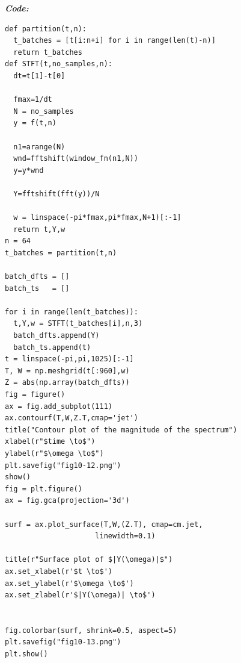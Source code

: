 \documentclass[11pt, a4paper]{article}
\begin{document}
\textit{\textbf{Code:}}
\begin{lstlisting}
def partition(t,n):
  t_batches = [t[i:n+i] for i in range(len(t)-n)]
  return t_batches
def STFT(t,no_samples,n):
  dt=t[1]-t[0]

  fmax=1/dt
  N = no_samples
  y = f(t,n)
  
  n1=arange(N)
  wnd=fftshift(window_fn(n1,N))
  y=y*wnd
      
  Y=fftshift(fft(y))/N
  
  w = linspace(-pi*fmax,pi*fmax,N+1)[:-1]        
  return t,Y,w
n = 64
t_batches = partition(t,n)

batch_dfts = []
batch_ts   = []

for i in range(len(t_batches)):
  t,Y,w = STFT(t_batches[i],n,3)
  batch_dfts.append(Y)
  batch_ts.append(t)
t = linspace(-pi,pi,1025)[:-1]
T, W = np.meshgrid(t[:960],w)
Z = abs(np.array(batch_dfts))
fig = figure()
ax = fig.add_subplot(111)
ax.contourf(T,W,Z.T,cmap='jet')
title("Contour plot of the magnitude of the spectrum")
xlabel(r"$time \to$")
ylabel(r"$\omega \to$")
plt.savefig("fig10-12.png")
show()
fig = plt.figure()
ax = fig.gca(projection='3d')

surf = ax.plot_surface(T,W,(Z.T), cmap=cm.jet,
                     linewidth=0.1)

title(r"Surface plot of $|Y(\omega)|$")
ax.set_xlabel(r'$t \to$')
ax.set_ylabel(r'$\omega \to$')
ax.set_zlabel(r'$|Y(\omega)| \to$')


fig.colorbar(surf, shrink=0.5, aspect=5)
plt.savefig("fig10-13.png")
plt.show()
\end{lstlisting}
\newpage
\end{document}
